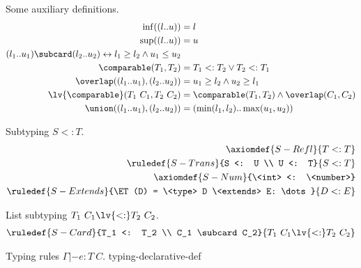 Some auxiliary definitions.
\begin{align*}
\inf((l..u)) &= l \\
\sup((l..u)) &= u \\
(l_1..u_1) \subcard (l_2..u_2) \leftrightarrow l_1 \geq l_2 \land u_1 \leq u_2 \\
\comparable(T_1, T_2) &= T_1 <: T_2 \lor T_2 <: T_1 \\
\overlap((l_1..u_1), (l_2..u_2)) &= u_1 \geq l_2 \land u_2 \geq l_1 \\
\lv{\comparable}(T_1\ C_1, T_2\ C_2) &= \comparable(T_1, T_2) \land \overlap(C_1, C_2) \\
\union((l_1..u_1), (l_2..u_2)) &= (\min(l_1, l_2)..\max(u_1, u_2))
\end{align*}

\begin{defbox}
Subtyping $S <: T$.
\begin{align*}
\axiomdef{S-Refl}{T <: T}
\\
\ruledef{S-Trans}{S <: U \\ U <: T}{S <: T}
\\
\axiomdef{S-Num}{\<int> <: \<number>}
\\
\ruledef{S-Extends}{\ET(D) = \<type> D \<extends> E: \dots}{D <: E}
\end{align*}

List subtyping $T_1\ C_1 \lv{<:} T_2\ C_2$.
\begin{align*}
\ruledef{S-Card}{T_1 <: T_2 \\ C_1 \subcard C_2}{T_1\ C_1 \lv{<:} T_2\ C_2}
\end{align*}

Typing rules $\Gamma |- e : T\ C$.
{typing-declarative-def}
\end{defbox}

